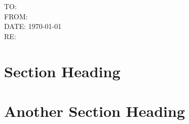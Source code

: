 \documentclass[12pt]{article}
\begin{document}
\noindent TO: \\
\noindent FROM: \\
\noindent DATE: \today\\
\noindent RE:

\lipsum[1]

\section{Section Heading}

\lipsum[2-3]

\section{Another Section Heading}

\lipsum[4]
\end{document}
